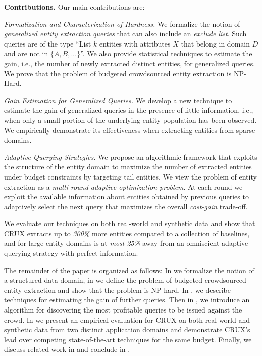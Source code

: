 \noindent
{\bf Contributions.} Our main contributions are:
\squishlist
\item {\em Formalization and Characterization of Hardness.} We formalize the notion of {\em generalized entity extraction queries} that can also include an {\em exclude list}. Such queries are of the type ``List $k$ entities with attributes $\bar{X}$ that belong in domain $D$ and are not in $\{A, B, ...\}$''. We also provide statistical techniques to estimate the gain, i.e., the number of newly extracted distinct entities, for generalized queries. We prove that the problem of budgeted crowdsourced entity extraction is NP-Hard. 
\item {\em Gain Estimation for Generalized Queries.}  We develop a new technique to estimate the gain of generalized queries in the presence of little information, i.e., when only a small portion of the underlying entity population has been observed. We empirically demonstrate its effectiveness when extracting entities from sparse domains.
\item {\em Adaptive Querying Strategies.} We propose an algorithmic framework that exploits the structure of the entity domain to maximize the number of extracted entities under budget constraints by targeting tail entities. We view the problem of entity extraction as a {\em multi-round adaptive optimization problem}. At  each round we exploit the available information about entities obtained by previous queries to adaptively select the next query that maximizes the overall {\em cost-gain} trade-off.
\squishend

We evaluate our techniques on both real-world and synthetic data and show that CRUX extracts up to {\em 300\%} more entities compared to a collection of baselines, and for large entity domains is at {\em most 25\%} away from an omniscient adaptive querying strategy with perfect information.

The remainder of the paper is organized as follows: In  we formalize the notion of a structured data domain, in  we define the problem of budgeted crowdsourced entity extraction and show that the problem is NP-hard. In , we describe techniques for estimating the gain of further queries. Then in , we introduce an algorithm for discovering the most profitable queries to be issued against the crowd. In  we present an empirical evaluation for CRUX on both real-world and synthetic data from two distinct application domains and demonstrate CRUX's lead over competing state-of-the-art techniques for the same budget. Finally, we discuss related work in  and conclude in .